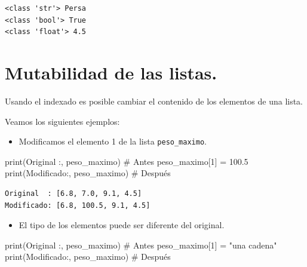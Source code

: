 \documentclass[
  spanish,
  letterpaper,
]{scrbook}
\newenvironment{Shaded}{\begin{snugshade}}{\end{snugshade}}
\newcommand{\BuiltInTok}[1]{\textcolor[rgb]{0.00,0.23,0.31}{#1}}
\newcommand{\CommentTok}[1]{\textcolor[rgb]{0.37,0.37,0.37}{#1}}
\newcommand{\DecValTok}[1]{\textcolor[rgb]{0.68,0.00,0.00}{#1}}
\newcommand{\FloatTok}[1]{\textcolor[rgb]{0.68,0.00,0.00}{#1}}
\newcommand{\NormalTok}[1]{\textcolor[rgb]{0.00,0.23,0.31}{#1}}
\newcommand{\OperatorTok}[1]{\textcolor[rgb]{0.37,0.37,0.37}{#1}}
\newcommand{\StringTok}[1]{\textcolor[rgb]{0.13,0.47,0.30}{#1}}
\providecommand{\tightlist}{%
  \setlength{\itemsep}{0pt}\setlength{\parskip}{0pt}}
\theoremstyle{definition}
\theoremstyle{remark}
\begin{document}
\begin{verbatim}
<class 'str'> Persa
<class 'bool'> True
<class 'float'> 4.5
\end{verbatim}

\section{Mutabilidad de las listas.}\label{mutabilidad-de-las-listas.}

Usando el indexado es posible cambiar el contenido de los elementos de
una lista.

Veamos los siguientes ejemplos:

\begin{itemize}
\tightlist
\item
  Modificamos el elemento 1 de la lista \texttt{peso\_maximo}.
\end{itemize}

\begin{Shaded}
\begin{Highlighting}[]
\BuiltInTok{print}\NormalTok{(}\StringTok{\textquotesingle{}Original  :\textquotesingle{}}\NormalTok{, peso\_maximo) }\CommentTok{\# Antes}
\NormalTok{peso\_maximo[}\DecValTok{1}\NormalTok{] }\OperatorTok{=} \FloatTok{100.5} 
\BuiltInTok{print}\NormalTok{(}\StringTok{\textquotesingle{}Modificado:\textquotesingle{}}\NormalTok{, peso\_maximo) }\CommentTok{\# Después}
\end{Highlighting}
\end{Shaded}

\begin{verbatim}
Original  : [6.8, 7.0, 9.1, 4.5]
Modificado: [6.8, 100.5, 9.1, 4.5]
\end{verbatim}

\begin{itemize}
\tightlist
\item
  El tipo de los elementos puede ser diferente del original.
\end{itemize}

\begin{Shaded}
\begin{Highlighting}[]
\BuiltInTok{print}\NormalTok{(}\StringTok{\textquotesingle{}Original  :\textquotesingle{}}\NormalTok{, peso\_maximo) }\CommentTok{\# Antes}
\NormalTok{peso\_maximo[}\DecValTok{1}\NormalTok{] }\OperatorTok{=} \StringTok{"una cadena"} 
\BuiltInTok{print}\NormalTok{(}\StringTok{\textquotesingle{}Modificado:\textquotesingle{}}\NormalTok{, peso\_maximo) }\CommentTok{\# Después}
\end{Highlighting}
\end{Shaded}
\end{document}
